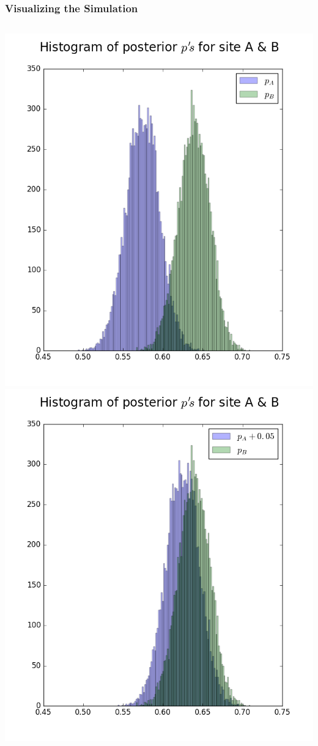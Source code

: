 \documentclass{beamer}
\begin{document}
\begin{frame}
  \frametitle{Visualizing the Simulation}
  \begin{columns}
      \includegraphics[width=\textwidth]{images/site_a_vs_b.png}
      \includegraphics[width=\textwidth]{images/site_a_vs_b_5.png}
  \end{columns}
\end{frame}
\end{document}
